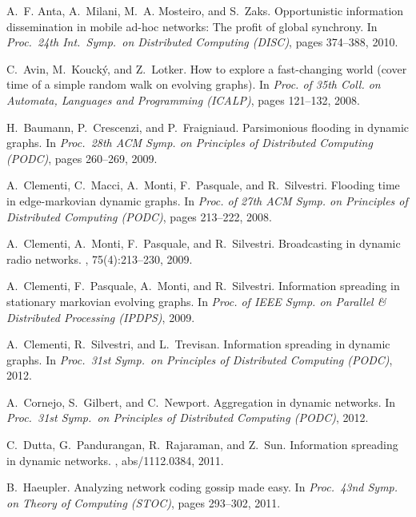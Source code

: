 \documentclass{llncs}
\begin{document}
\begin{thebibliography}{10}

A.~F. Anta, A.~Milani, M.~A. Mosteiro, and S.~Zaks.
\newblock Opportunistic information dissemination in mobile ad-hoc networks:
  The profit of global synchrony.
\newblock In {\em Proc.\ 24th Int.\ Symp.\ on Distributed Computing (DISC)},
  pages 374--388, 2010.

C.~Avin, M.~Kouck\'{y}, and Z.~Lotker.
\newblock How to explore a fast-changing world (cover time of a simple random
  walk on evolving graphs).
\newblock In {\em Proc. of 35th Coll. on Automata, Languages and Programming
  (ICALP)}, pages 121--132, 2008.

H.~Baumann, P.~Crescenzi, and P.~Fraigniaud.
\newblock Parsimonious flooding in dynamic graphs.
\newblock In {\em Proc.\ 28th ACM Symp. on Principles of Distributed Computing
  (PODC)}, pages 260--269, 2009.

A.~Clementi, C.~Macci, A.~Monti, F.~Pasquale, and R.~Silvestri.
\newblock Flooding time in edge-markovian dynamic graphs.
\newblock In {\em Proc. of 27th ACM Symp. on Principles of Distributed
  Computing (PODC)}, pages 213--222, 2008.

A.~Clementi, A.~Monti, F.~Pasquale, and R.~Silvestri.
\newblock Broadcasting in dynamic radio networks.
, 75(4):213--230, 2009.

A.~Clementi, F.~Pasquale, A.~Monti, and R.~Silvestri.
\newblock Information spreading in stationary markovian evolving graphs.
\newblock In {\em Proc. of IEEE Symp. on Parallel \& Distributed Processing
  (IPDPS)}, 2009.

A.~Clementi, R.~Silvestri, and L.~Trevisan.
\newblock Information spreading in dynamic graphs.
\newblock In {\em Proc.\ 31st Symp.\ on Principles of Distributed Computing
  (PODC)}, 2012.

A.~Cornejo, S.~Gilbert, and C.~Newport.
\newblock Aggregation in dynamic networks.
\newblock In {\em Proc.\ 31st Symp.\ on Principles of Distributed Computing
  (PODC)}, 2012.

C.~Dutta, G.~Pandurangan, R.~Rajaraman, and Z.~Sun.
\newblock Information spreading in dynamic networks.
, abs/1112.0384, 2011.

B.~Haeupler.
\newblock Analyzing network coding gossip made easy.
\newblock In {\em Proc.\ 43nd Symp. on Theory of Computing (STOC)}, pages
  293--302, 2011.


\end{thebibliography}
\end{document}
